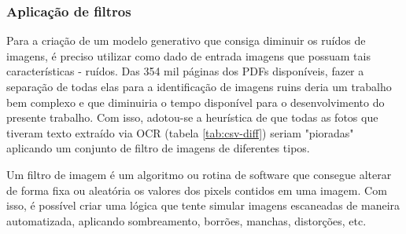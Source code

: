 \subsubsection{Aplicação de filtros}
Para a criação de um modelo generativo que consiga diminuir os ruídos de imagens, é preciso utilizar como dado de entrada imagens que possuam tais características - ruídos. Das 354 mil páginas dos PDFs disponíveis, fazer a separação de todas elas para a identificação de imagens ruins deria um trabalho bem complexo e que diminuiria o tempo disponível para o desenvolvimento do presente trabalho. Com isso, adotou-se a heurística de que todas as fotos que tiveram texto extraído via OCR (tabela \ref{tab:csv-diff}) seriam "pioradas" aplicando um conjunto de filtro de imagens de diferentes tipos.

Um filtro de imagem é um algoritmo ou rotina de software que consegue alterar de forma fixa ou aleatória os valores dos pixels contidos em uma imagem. Com isso, é possível criar uma lógica que tente simular imagens escaneadas de maneira automatizada, aplicando sombreamento, borrões, manchas, distorções, etc.


